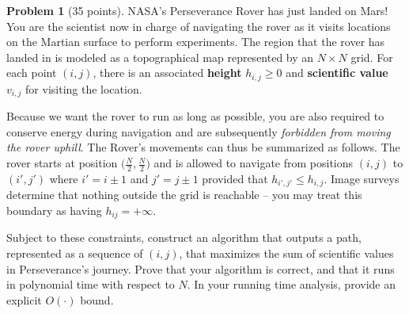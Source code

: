 \documentclass[10pt]{article}
\theoremstyle{definition}
\newtheorem{problem}{\sc\color{cit}Problem}
\begin{document}
\newpage
\begin{problem}[35 points]
NASA's Perseverance Rover has just landed on Mars! You are the scientist now in charge of navigating the rover as it visits locations on the Martian surface to perform experiments. The region that the rover has landed in is modeled as a topographical map represented by an $N \times N$ grid. For each point $(i, j)$, there is an associated \textbf{height} $h_{i,j} \geq 0$ and \textbf{scientific value} $v_{i,j}$ for visiting the location. 

Because we want the rover to run as long as possible, you are also required to conserve energy during navigation and are subsequently \emph{forbidden from moving the rover uphill}. The Rover's movements can thus be summarized as follows. The rover starts at position $\big( \frac{N}{2}, \frac{N}{2} \big)$ and is allowed to navigate from positions $(i, j)$ to $(i', j')$ where $i' = i \pm 1$ and $j' = j \pm 1$ provided that $h_{i',j'} \leq h_{i, j}$. Image surveys determine that nothing outside the grid is reachable -- you may treat this boundary as having $h_{ij} = +\infty$.

Subject to these constraints, construct an algorithm that outputs a path, represented as a sequence of $(i, j)$, that maximizes the sum of scientific values in Perseverance’s journey. Prove that your algorithm is correct, and that it runs in polynomial time with respect to $N$. In your running time analysis, provide an explicit $O(\cdot)$ bound.
\end{problem}
\end{document}
